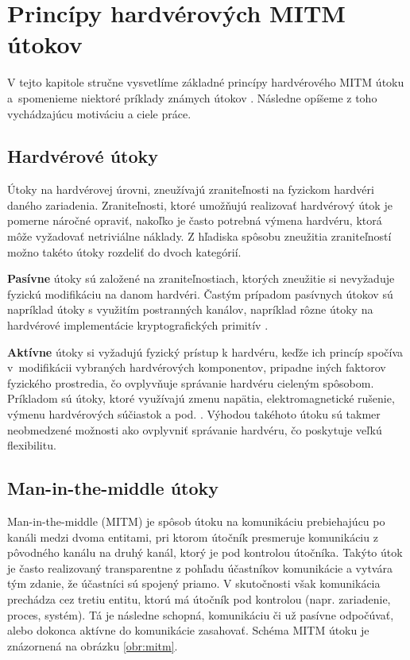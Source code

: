 \chapter{Princípy hardvérových MITM útokov}
\label{kap:principy}
V tejto kapitole stručne vysvetlíme základné princípy hardvérového MITM útoku a~spomenieme niektoré príklady známych útokov \cite{mitmSmartphone, mitmTouch, mitmTPM, mitmBitlocker, mitmI2C}. Následne opíšeme z toho vychádzajúcu motiváciu a ciele práce.

\section{Hardvérové útoky}
Útoky na hardvérovej úrovni, zneužívajú zraniteľnosti na fyzickom hardvéri daného zariadenia. Zraniteľnosti, ktoré umožňujú realizovať hardvérový útok je pomerne náročné opraviť, nakoľko je často potrebná výmena hardvéru, ktorá môže vyžadovať netriviálne náklady. Z hľadiska spôsobu zneužitia zraniteľností možno takéto útoky rozdeliť do dvoch kategórií.

\textbf{Pasívne} útoky sú založené na zraniteľnostiach, ktorých zneužitie si nevyžaduje fyzickú modifikáciu na danom hardvéri. Častým prípadom pasívnych útokov sú napríklad útoky s využitím postranných kanálov, napríklad rôzne útoky na hardvérové implementácie kryptografických primitív \cite{hwSec}.

\textbf{Aktívne} útoky si vyžadujú fyzický prístup k hardvéru, keďže ich princíp spočíva v~modifikácii vybraných hardvérových komponentov, pripadne iných faktorov fyzického prostredia, čo ovplyvňuje správanie hardvéru cieleným spôsobom. Príkladom sú útoky, ktoré využívajú zmenu napätia, elektromagnetické rušenie, výmenu hardvérových súčiastok a pod. \cite{hwSec}. Výhodou takéhoto útoku sú takmer neobmedzené možnosti ako ovplyvniť správanie hardvéru, čo poskytuje veľkú flexibilitu.

\section{Man-in-the-middle útoky}
Man-in-the-middle (MITM) je spôsob útoku na komunikáciu prebiehajúcu po kanáli medzi dvoma entitami, pri ktorom útočník presmeruje komunikáciu z pôvodného kanálu na druhý kanál, ktorý je pod kontrolou útočníka. Takýto útok je často realizovaný transparentne z pohľadu účastníkov komunikácie a vytvára tým zdanie, že účastníci sú spojený priamo. V skutočnosti však komunikácia prechádza cez tretiu entitu, ktorú má útočník pod kontrolou (napr. zariadenie, proces, systém). Tá je následne schopná, komunikáciu či už pasívne odpočúvať, alebo dokonca aktívne do komunikácie zasahovať. Schéma MITM útoku je znázornená na obrázku \ref{obr:mitm}.

